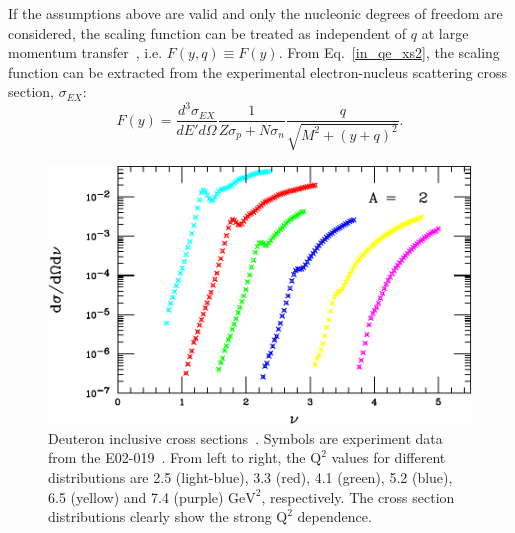 If the assumptions above are valid and only the nucleonic degrees of freedom are considered, the scaling function can be treated as independent of $q$ at large momentum transfer~\cite{Boffi19931}, i.e. $F(y,q)\equiv F(y)$. From Eq.~\eqref{in_qe_xs2}, the scaling function can be extracted from the experimental electron-nucleus scattering cross section, $\sigma_{EX}$:
\begin{equation}
  F(y)=\frac{d^{3}\sigma_{EX}}{dE' d\Omega } \frac{1}{Z\sigma_{p}+N\sigma_{n}} \frac{q}{\sqrt{M^{2}+(y+q)^{2}}}.
  \label{fy_scaling_eq2}
\end{equation}
\begin{figure}[!ht]
  \begin{center}
    \includegraphics[type=pdf,ext=.pdf,read=.pdf,width=0.80\linewidth]{./figures/physics/xemdeutcs}
    \caption[Deuteron inclusive cross section]{\footnotesize{Deuteron inclusive cross sections~\cite{PhysRevLett.108.092502}. Symbols are experiment data from the E02-019~\cite{nadia_thesis}. From left to right, the $\mathrm{Q^{2}}$ values for different distributions are 2.5 (light-blue), 3.3 (red), 4.1 (green), 5.2 (blue), 6.5 (yellow) and 7.4 (purple) $\mathrm{GeV^{2}}$, respectively. The cross section distributions clearly show the strong $\mathrm{Q^{2}}$ dependence.}}
    \label{nadia_cs_deut}
  \end{center}
\end{figure}
